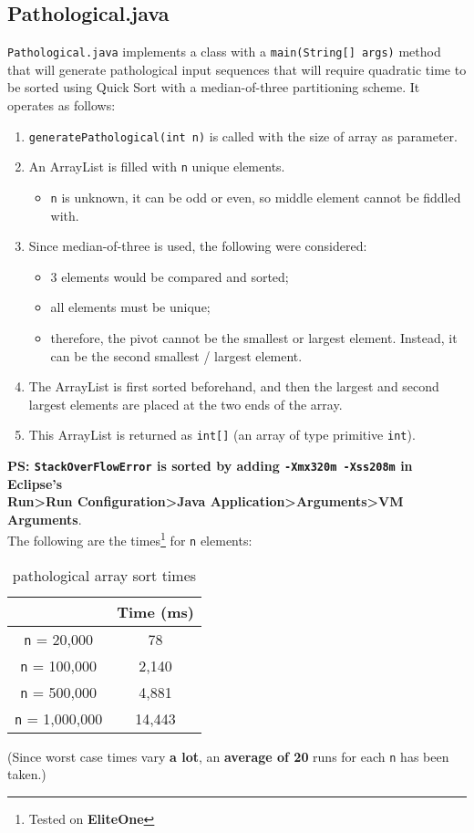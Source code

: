 \documentclass{article}
\newcommand{\code}[1]{\texttt{#1}}
\begin{document}
\subsection{Pathological.java}
\code{Pathological.java} implements a class with a \code{main(String[] args)} method that will generate pathological input sequences that will require quadratic time to be sorted using Quick Sort with a median-of-three partitioning scheme. It operates as follows:
\begin{enumerate}
    \item \code{generatePathological(int n)} is called with the size of array as parameter.
    \item An ArrayList is filled with \code{n} unique elements.
    \begin{itemize}
        \item \code{n} is unknown, it can be odd or even, so middle element cannot be fiddled with.
    \end{itemize}
    \item Since median-of-three is used, the following were considered:
    \begin{itemize}
        \item 3 elements would be compared and sorted;
        \item all elements must be unique;
        \item therefore, the pivot cannot be the smallest or largest element. Instead, it can be the second smallest / largest element.
    \end{itemize}
    \item The ArrayList is first sorted beforehand, and then the largest and second largest elements are placed at the two ends of the array.
    \item This ArrayList is returned as \code{int[]} (an array of type primitive \code{int}).
\end{enumerate}
\textbf{PS: \code{StackOverFlowError} is sorted by adding \code{-Xmx320m -Xss208m} in Eclipse's\\ Run\textgreater Run Configuration\textgreater Java Application\textgreater Arguments\textgreater VM Arguments}. \\
The following are the times\footnote[1]{Tested on \textbf{EliteOne}} for \code{n} elements:

\begin{table}[H]
\centering
\begin{tabular}{|c|c|}
\hline
                     & Time (ms) \\ \hline
\code{n} = 20,000    & 78                        \\ \hline
\code{n} = 100,000   & 2,140                      \\ \hline
\code{n} = 500,000   & 4,881                     \\ \hline
\code{n} = 1,000,000 & 14,443                          \\ \hline
\end{tabular}
\caption{pathological array sort times}
\label{tab:my-table}
\end{table}

(Since worst case times vary \textbf{a lot}, an \textbf{average of 20} runs for each \code{n} has been taken.)

\restoregeometry
\end{document}
